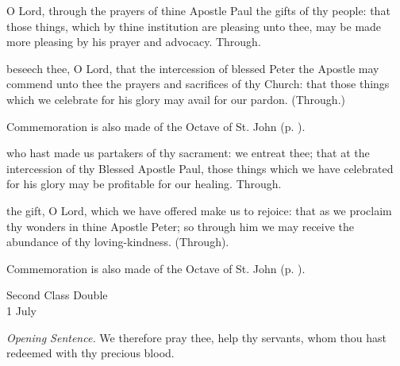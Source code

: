 
\secret
{} O Lord, through the prayers of thine Apostle Paul the gifts of thy people: that those things, which by thine institution are pleasing unto thee, may be made more pleasing by his prayer and advocacy. Through.

 beseech thee, O Lord, that the intercession of blessed Peter the Apostle may commend unto thee the prayers and sacrifices of thy Church: that those things which we celebrate for his glory may avail for our pardon. (Through.)

\begin{rubric}
	Commemoration is also made of the Octave of St. John (p. \pageref{JohnSecret}).
\end{rubric}


\postcommunion
{} who hast made us partakers of thy sacrament: we entreat thee; that at the intercession of thy Blessed Apostle Paul, those things which we have celebrated for his glory may be profitable for our healing. Through.

 the gift, O Lord, which we have offered make us to rejoice: that as we proclaim thy wonders in thine Apostle Peter; so through him we may receive the abundance of thy loving-kindness. (Through).

\begin{rubric}
	Commemoration is also made of the Octave of St. John (p. \pageref{JohnPC}).
\end{rubric}


\begin{inhead}
    {Second Class Double\\
1 July}
\end{inhead}
\par\noindent
\textit{Opening Sentence.} We therefore pray thee, help thy servants, whom thou hast redeemed with thy precious blood.

